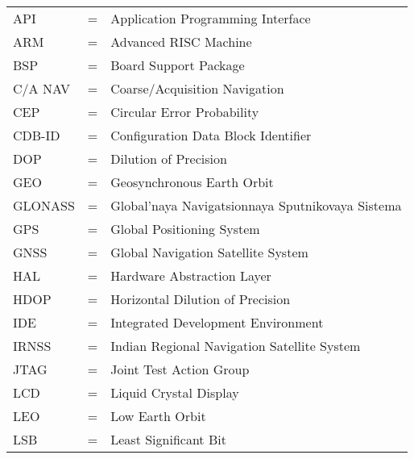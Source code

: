 
\begin{tabular}{llp{3in}}
	API &  \hspace{1.5cm} = & Application Programming Interface\\
	ARM &  \hspace{1.5cm} = & Advanced RISC Machine\\
	BSP &  \hspace{1.5cm} = & Board Support Package\\
	C/A NAV &  \hspace{1.5cm} = & Coarse/Acquisition Navigation\\
	CEP &  \hspace{1.5cm} = & Circular Error Probability \\
	CDB-ID &  \hspace{1.5cm} = & Configuration Data Block Identifier \\
	DOP &  \hspace{1.5cm} = & Dilution of Precision \\
	GEO &  \hspace{1.5cm} = & Geosynchronous Earth Orbit\\
	GLONASS &  \hspace{1.5cm} = & Global'naya Navigatsionnaya Sputnikovaya Sistema\\
	GPS &  \hspace{1.5cm} = & Global Positioning System\\
	GNSS &  \hspace{1.5cm} = & Global Navigation Satellite System\\
	HAL &  \hspace{1.5cm} = & Hardware Abstraction Layer\\
	HDOP &  \hspace{1.5cm} = & Horizontal Dilution of Precision \\
	IDE &  \hspace{1.5cm} = & Integrated Development Environment\\
	IRNSS &  \hspace{1.5cm} = & Indian Regional Navigation Satellite System\\
	JTAG &  \hspace{1.5cm} = & Joint Test Action Group \\
	LCD &  \hspace{1.5cm} = & Liquid Crystal Display\\
	LEO &  \hspace{1.5cm} = & Low Earth Orbit\\
	LSB &  \hspace{1.5cm} = & Least Significant Bit \\

\end{tabular}
